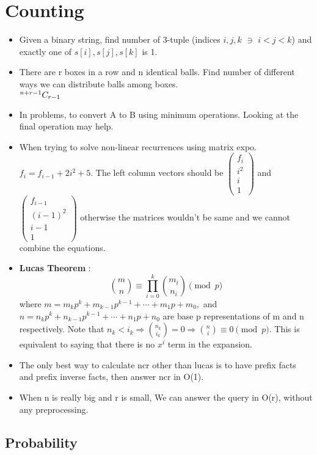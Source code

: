 \documentclass[../Notes.tex]{subfiles}
\begin{document}
\chapter{Counting}

\begin{itemize}
	\item Given a binary string, find number of 3-tuple (indices $i,j,k$ $\ni$ $i<j<k$) and exactly one of $s[i],s[j],s[k]$ is 1. 
	\item There are r boxes in a row and n identical balls. Find number of different ways we can distribute balls among boxes.\\
	${}^{n+r-1}C_{r-1}$
	\item In problems, to convert A to B using minimum operations. Looking at the final operation may help.
	\item When trying to solve non-linear recurrences using matrix expo.
	$f_i = f_{i - 1} + 2i^2 + 5$. The left column vectors should be
	$\begin{pmatrix} f_i\\ i^2\\ i\\ 1\end{pmatrix}$ and $\begin{pmatrix} f_{i-1}\\ (i-1)^2\\ i-1\\ 1\end{pmatrix}$ otherwise the matrices wouldn't be same and we cannot combine the equations.
	\item \textbf{Lucas Theorem} : $${\binom {m}{n}}\equiv \prod _{i=0}^{k}{\binom {m_{i}}{n_{i}}}{\pmod {p}}$$
	where $m=m_{k}p^{k}+m_{k-1}p^{k-1}+\cdots +m_{1}p+m_{0},$ and\\ 
	$n=n_{k}p^{k}+n_{k-1}p^{k-1}+\cdots +n_{1}p+n_{0}$ are base p representations of m and n respectively. Note that 
	$n_k<i_k\Longrightarrow\binom{n_k}{i_k}=0\Longrightarrow\binom{n}{i}\equiv 0 \pmod{p}$. This is equivalent to saying that there is no $x^i$ term in the expansion.
	\item The only best way to calculate ncr other than lucas is to have prefix facts and prefix inverse facts, then answer ncr in O(1).
	\item When n is really big and r is small, We can answer the query in O(r), without any preprocessing.
\end{itemize}
\section{Probability}
\end{document}
